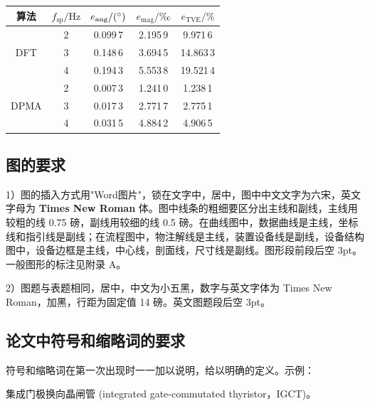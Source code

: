 \documentclass[UTF8,twoside,a4paper,fontset=none]{ctexart}
\begin{document}
\begin{cseetableblock}
  \cseetabletext
  \label{tab:1}
  \begin{tabular*}{\linewidth}{@{\extracolsep{\fill}}ccccc@{}}
    \toprule
    算法 & $f_{\text{sp}}/\text{Hz}$ & $e_{\text{ang}}/({}^{\circ})$ & $e_{\text{mag}}/\text{‰}$ & $e_{\text{TVE}}/\%$ \\
    \midrule
    \multirow{3}{*}{DFT}  & 2 & 0.099\,7 & 2.195\,9 & 9.971\,6 \\
                          & 3 & 0.148\,6 & 3.694\,5 & 14.863\,3 \\
                          & 4 & 0.194\,3 & 5.553\,8 & 19.521\,4 \\
    \midrule
    \multirow{3}{*}{DPMA} & 2 & 0.007\,3 & 1.241\,0 & 1.238\,1 \\
                         & 3 & 0.017\,3 & 2.771\,7 & 2.775\,1 \\
                         & 4 & 0.031\,5 & 4.884\,2 & 4.906\,5 \\
    \bottomrule
  \end{tabular*}
\end{cseetableblock}

\subsection{图的要求}
1）图的插入方式用"Word图片"，锁在文字中，居中，图中中文文字为六宋，英文字母为 {\cseetnr\bfseries Times New Roman} 体。图中线条的粗细要区分出主线和副线，主线用较粗的线 0.75 磅，副线用较细的线 0.5 磅。在曲线图中，数据曲线是主线，坐标线和指引线是副线；在流程图中，物注解线是主线，装置设备线是副线，设备结构图中，设备边框是主线，中心线，剖面线，尺寸线是副线。图形段前段后空 3pt。一般图形的标注见附录 A。

2）图题与表题相同，居中，中文为小五黑，数字与英文字体为 Times New Roman，加黑，行距为固定值 14 磅。英文图题段后空 3pt。

\subsection{论文中符号和缩略词的要求}
符号和缩略词在第一次出现时一一加以说明，给以明确的定义。示例：

{\songti 集成门极换向晶闸管 }{\cseetnr(integrated gate-commutated thyristor}{\songti ，}{\cseetnr IGCT)}{\songti 。}
\end{document}

